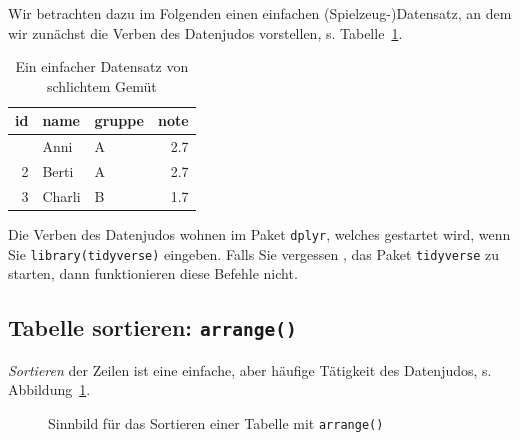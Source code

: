 \documentclass[
  letterpaper,
]{scrbook}
\theoremstyle{definition}
\theoremstyle{definition}
\theoremstyle{definition}
\theoremstyle{remark}
\begin{document}
Wir betrachten dazu im Folgenden einen einfachen (Spielzeug-)Datensatz,
an dem wir zunächst die Verben des Datenjudos vorstellen, s.
Tabelle~\ref{tbl-datenjudo}.

\begin{longtable}[]{@{}rllr@{}}

\caption{\label{tbl-datenjudo}Ein einfacher Datensatz von schlichtem
Gemüt}

\tabularnewline

\toprule\noalign{}
id & name & gruppe & note \\
\midrule\noalign{}
\endhead
\bottomrule\noalign{}
\endlastfoot
1 & Anni & A & 2.7 \\
2 & Berti & A & 2.7 \\
3 & Charli & B & 1.7 \\

\end{longtable}

Die Verben des Datenjudos wohnen im Paket \texttt{dplyr}, welches
gestartet wird, wenn Sie \texttt{library(tidyverse)} eingeben. Falls Sie
vergessen , das Paket \texttt{tidyverse} zu starten, dann funktionieren
diese Befehle nicht.

\subsection{\texorpdfstring{Tabelle sortieren:
\texttt{arrange()}}{Tabelle sortieren: arrange()}}\label{tabelle-sortieren-arrange}

\emph{Sortieren} der Zeilen ist eine einfache, aber häufige Tätigkeit
des Datenjudos, s. Abbildung~\ref{fig-arrange}.

\begin{figure}


\caption{\label{fig-arrange}Sinnbild für das Sortieren einer Tabelle mit
\texttt{arrange()}}

\end{figure}%
\end{document}

